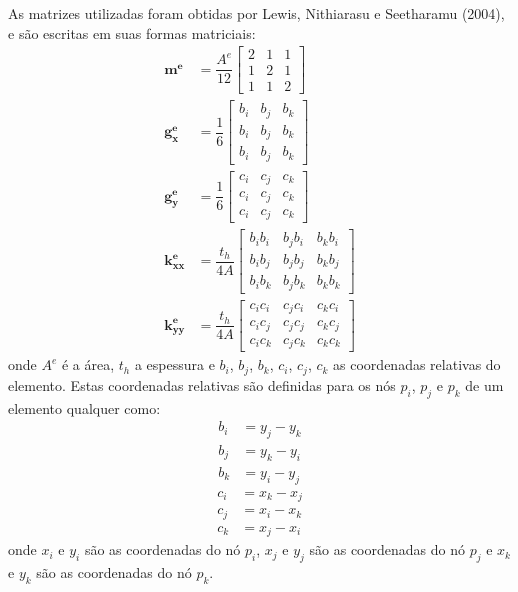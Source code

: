 As matrizes utilizadas foram obtidas por Lewis, Nithiarasu e Seetharamu (2004)\cite{lewis}, e são escritas em suas formas matriciais:
\begin{align}
    \mathbf{m^e} &=
    \dfrac{A^e}{12}
    \begin{bmatrix} 
        2 & 1 & 1 \\
        1 & 2 & 1 \\
        1 & 1 & 2
    \end{bmatrix} \\
    \mathbf{g_x^e} &=
    \dfrac{1}{6}
    \begin{bmatrix} 
        b_i & b_j & b_k \\
        b_i & b_j & b_k \\
        b_i & b_j & b_k
    \end{bmatrix} \\
    \mathbf{g_y^e} &=
    \dfrac{1}{6}
    \begin{bmatrix} 
        c_i & c_j & c_k \\
        c_i & c_j & c_k \\
        c_i & c_j & c_k
    \end{bmatrix} \\
    \mathbf{k_{xx}^e} &=
    \dfrac{t_h}{4A}
    \begin{bmatrix} 
        b_i b_i & b_j b_i & b_k b_i \\
        b_i b_j & b_j b_j & b_k b_j \\
        b_i b_k & b_j b_k & b_k b_k
    \end{bmatrix} \\
    \mathbf{k_{yy}^e} &=
    \dfrac{t_h}{4A}
    \begin{bmatrix} 
        c_i c_i & c_j c_i & c_k c_i \\
        c_i c_j & c_j c_j & c_k c_j \\
        c_i c_k & c_j c_k & c_k c_k
    \end{bmatrix}
\end{align}
onde $A^e$ é a área, $t_h$ a espessura e $b_i$, $b_j$, $b_k$, $c_i$, $c_j$, $c_k$ as coordenadas relativas do elemento.
Estas coordenadas relativas são definidas para os nós $p_i$, $p_j$ e $p_k$ de um elemento qualquer como:
\begin{align}
    b_i &= y_j - y_k \\
    b_j &= y_k - y_i \\
    b_k &= y_i - y_j
\end{align}
\begin{align}
    c_i &= x_k - x_j \\
    c_j &= x_i - x_k \\
    c_k &= x_j - x_i
\end{align}
onde $x_i$ e $y_i$ são as coordenadas do nó $p_i$, $x_j$ e $y_j$ são as coordenadas do nó $p_j$ e $x_k$ e $y_k$ são as coordenadas do nó $p_k$.

